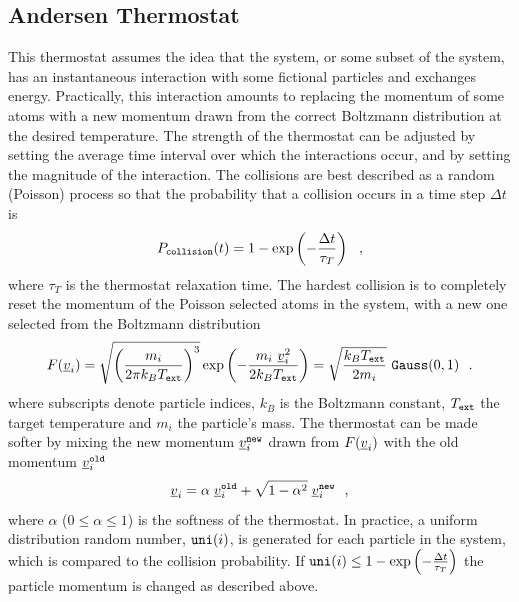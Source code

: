 \subsection{Andersen Thermostat}

This thermostat assumes the idea that the system, or some subset of
the system, has an instantaneous interaction with some fictional
particles and exchanges energy.  Practically, this interaction
amounts to replacing the momentum of some atoms with a new momentum
drawn from the correct Boltzmann distribution at the desired
temperature.  The strength of the thermostat can be adjusted by
setting the average time interval over which the interactions
occur, and by setting the magnitude of the interaction.  The
collisions are best described as a random (Poisson) process so that
the probability that a collision occurs
in a time step $\Delta t$ is
\begin{equation}
P_{\tt collision}(t) = 1 - \exp \left(-\frac{\Delta t}{\tau_{T}}\right)~~,
\end{equation}
where $\tau_{T}$ is the thermostat relaxation time.  The hardest
collision is to completely reset the momentum of the Poisson
selected atoms in the system, with a new one selected from the
Boltzmann distribution
\begin{equation}
F(\mbox{$\underline{v}$}_{i}) = \sqrt{\left(\frac{m_{i}}{2 \pi k_{B}T_{\tt ext}}\right)^{3}}
\exp \left(-\frac{m_{i}~\mbox{$\underline{v}$}_{i}^{2}}{2 k_{B}T_{\tt ext}}\right) =
\sqrt{\frac{k_{B}T_{\tt ext}}{2 m_{i}}}~{\tt Gauss}(0,1)~~.
\end{equation}
where subscripts denote particle indices, $k_{B}$ is the Boltzmann
constant, $T_{\tt ext}$ the target temperature and $m_{i}$ the particle's mass.
The thermostat can be made softer by mixing the new momentum
$\mbox{$\underline{v}$}_{i}^{\tt new}$ drawn from $F(\mbox{$\underline{v}$}_{i})$ with the old
momentum $\mbox{$\underline{v}$}_{i}^{\tt old}$
\begin{equation}
\mbox{$\underline{v}$}_{i} = \alpha \; \mbox{$\underline{v}$}_{i}^{\tt old} +
\sqrt{1-\alpha^{2}} \; \mbox{$\underline{v}$}_{i}^{\tt new}~~,
\end{equation}
where $\alpha$ ($0 \le \alpha \le 1$) is the softness of the
thermostat.  In practice, a uniform distribution random number,
${\tt uni}(i)$, is generated for each particle in the system,
which is compared to the collision probability.  If
${\tt uni}(i) \le 1 - \exp \left(-\frac{\Delta t}{\tau_{T}}\right)$
the particle momentum is changed as described above.

